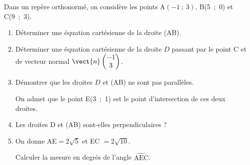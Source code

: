 \medskip
Dans un repère orthonormé, on considère les points A$(-1~;~3)$, B(5~;~0) et C(9~;~3).

\medskip

\begin{enumerate}
\item Déterminer une équation cartésienne de la droite (AB).
\item Déterminer une équation cartésienne de la droite $D$ passant par le point C et de vecteur normal $\vect{n}\begin{pmatrix}-1\\3\end{pmatrix}$.
\item Démontrer que les droites $D$ et (AB) ne sont pas parallèles.

On admet que le point E(3~;~1) est le point d'intersection de ces deux droites.
\item Les droites D et (AB) sont-elles perpendiculaires ?
\item On donne AE$= 2\sqrt{5}$ et EC $= 2\sqrt{10}$.

Calculer la mesure en degrés de l'angle $\widehat{\text{AEC}}$.
\end{enumerate}

\bigskip
